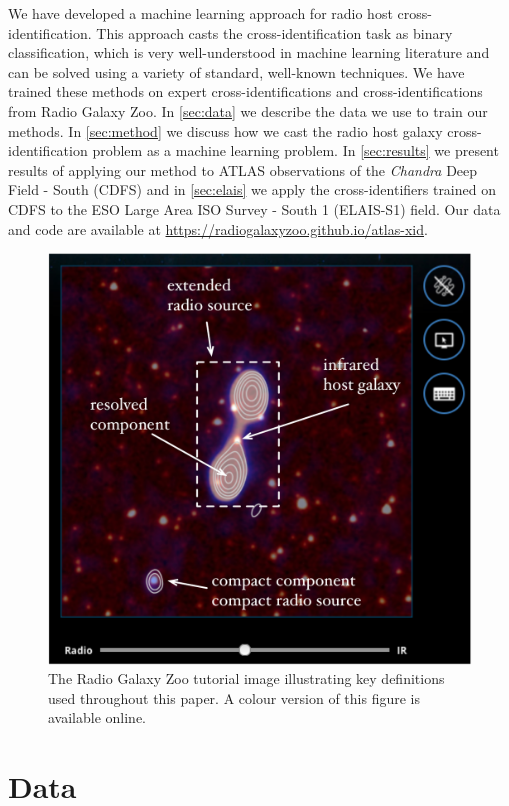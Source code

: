 \documentclass[fleqn,usenatbib,usedcolumn]{mnras}
\begin{document}
  We have developed a machine learning approach for radio host
  cross-identification. This approach casts the cross-identification task as
  binary classification, which is very well-understood in machine learning
  literature and can be solved using a variety of standard, well-known
  techniques. We have trained these methods on expert cross-identifications
  and cross-identifications from Radio Galaxy Zoo. In \autoref{sec:data} we
  describe the data we use to train our methods. In \autoref{sec:method} we
  discuss how we cast the radio host galaxy cross-identification problem as a
  machine learning problem. In \autoref{sec:results} we present results of
  applying our method to ATLAS observations of the \emph{Chandra} Deep Field -
  South (CDFS) and in \autoref{sec:elais} we apply the cross-identifiers
  trained on CDFS to the ESO Large Area ISO Survey - South 1 (ELAIS-S1) field.
  Our data and code are available at
  \url{https://radiogalaxyzoo.github.io/atlas-xid}.

  \begin{figure}
  \begin{center}
    \includegraphics[width=0.75\linewidth]{images/fig1.png}
    \caption{The Radio Galaxy Zoo tutorial image illustrating key definitions
      used throughout this paper. A colour version of this figure is available
      online.}\label{fig1}
  \end{center}
  \end{figure}

\section{Data}\label{sec:data}
\end{document}
